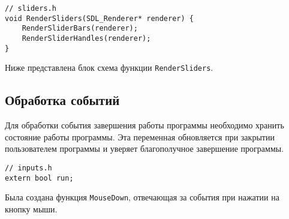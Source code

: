\documentclass[14pt]{extarticle}
\begin{document}
{    \begin{lstlisting}
// sliders.h
void RenderSliders(SDL_Renderer* renderer) {
	RenderSliderBars(renderer);
	RenderSliderHandles(renderer);
}\end{lstlisting}

    \begin{spacing}{1.5}
        \noindent
        Ниже представлена блок схема функции \verb|RenderSliders|.
    \end{spacing}

    \vspace{-0.5em}
    \begin{center}
    \end{center}

    \par

    {
        \par
        \subsection{Обработка событий}
        \label{sec:events}
        \par
    }

    \begin{spacing}{1.5}
        \par
        Для обработки события завершения работы программы необходимо хранить состояние работы программы. Эта переменная обновляется при закрытии пользователем программы и уверяет благополучное завершение программы.
    \end{spacing}

    \begin{lstlisting}
// inputs.h
extern bool run;\end{lstlisting}

    \begin{spacing}{1.5}
        Была создана функция \verb|MouseDown|, отвечающая за события при нажатии на кнопку мыши.
    \end{spacing}

}
\end{document}
